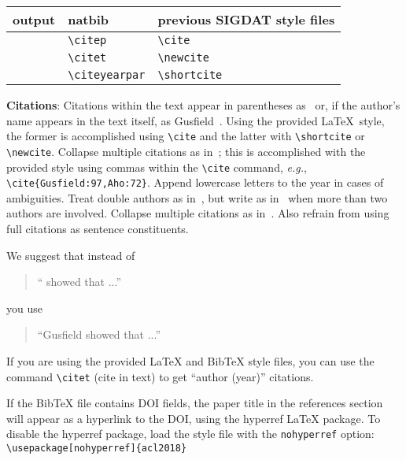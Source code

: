 \documentclass[11pt,a4paper]{article}
\newcommand\conforg{SIGDAT}
\begin{document}
\begin{table*}[t!]
\centering
\begin{tabular}{lll}
  output & natbib & previous \conforg{} style files\\
  \hline
  \citep{Gusfield:97} & \verb|\citep| & \verb|\cite| \\
  \citet{Gusfield:97} & \verb|\citet| & \verb|\newcite| \\
  \citeyearpar{Gusfield:97} & \verb|\citeyearpar| & \verb|\shortcite| \\
\end{tabular}
\caption{Citation commands supported by the style file.
  The citation style is based on the natbib package and
  supports all natbib citation commands.
  It also supports commands defined in previous \conforg{} style files
  for compatibility.
  }
\end{table*}

{\bf Citations}: Citations within the text appear in parentheses
as~\cite{Gusfield:97} or, if the author's name appears in the text
itself, as Gusfield~.
Using the provided \LaTeX\ style, the former is accomplished using
{\small\verb|\cite|} and the latter with {\small\verb|\shortcite|} or {\small\verb|\newcite|}. Collapse multiple citations as in~\cite{Gusfield:97,Aho:72}; this is accomplished with the provided style using commas within the {\small\verb|\cite|} command, {\em e.g.}, {\small\verb|\cite{Gusfield:97,Aho:72}|}. Append lowercase letters to the year in cases of ambiguities.  
 Treat double authors as
in~\cite{Aho:72}, but write as in~\cite{Chandra:81} when more than two
authors are involved. Collapse multiple citations as
in~\cite{Gusfield:97,Aho:72}. Also refrain from using full citations
as sentence constituents.

We suggest that instead of
\begin{quote}
  ``\cite{Gusfield:97} showed that ...''
\end{quote}
you use
\begin{quote}
``Gusfield    showed that ...''
\end{quote}

If you are using the provided \LaTeX{} and Bib\TeX{} style files, you
can use the command \verb|\citet| (cite in text)
to get ``author (year)'' citations.

If the Bib\TeX{} file contains DOI fields, the paper
title in the references section will appear as a hyperlink
to the DOI, using the hyperref \LaTeX{} package.
To disable the hyperref package, load the style file
with the \verb|nohyperref| option: \\{\small
\verb|\usepackage[nohyperref]{acl2018}|}
\end{document}
